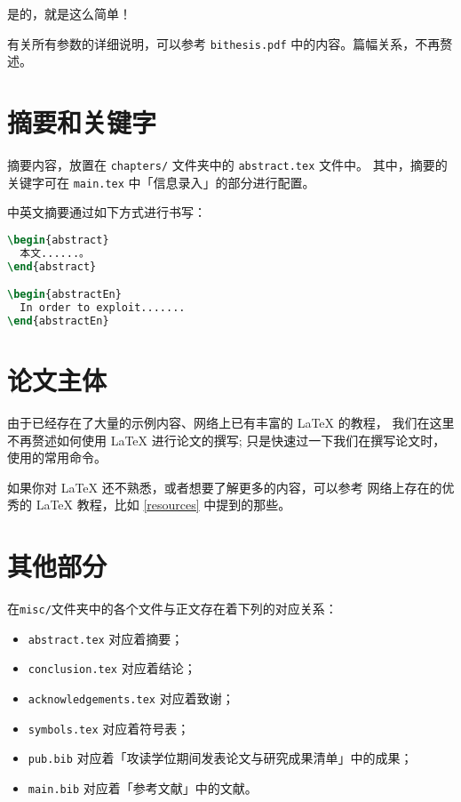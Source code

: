 是的，就是这么简单！

有关所有参数的详细说明，可以参考 \texttt{bithesis.pdf} 中的内容。篇幅关系，不再赘述。

\section{摘要和关键字}

摘要内容，放置在 \texttt{chapters/} 文件夹中的 \texttt{abstract.tex} 文件中。
其中，摘要的关键字可在 \texttt{main.tex} 中「信息录入」的部分进行配置。

中英文摘要通过如下方式进行书写：

\begin{lstlisting}[language=TeX]
\begin{abstract}
  本文......。
\end{abstract}

\begin{abstractEn}
  In order to exploit.......
\end{abstractEn}
\end{lstlisting}


\section{论文主体}

由于已经存在了大量的示例内容、网络上已有丰富的 \LaTeX{} 的教程，
我们在这里不再赘述如何使用 \LaTeX{} 进行论文的撰写;
只是快速过一下我们在撰写论文时，使用的常用命令。

如果你对 \LaTeX{} 还不熟悉，或者想要了解更多的内容，可以参考
网络上存在的优秀的 \LaTeX{} 教程，比如 \ref{resources} 中提到的那些。

\section{其他部分}

在\texttt{misc/}文件夹中的各个文件与正文存在着下列的对应关系：
\begin{itemize}
  \item \texttt{abstract.tex} 对应着摘要；
  \item \texttt{conclusion.tex} 对应着结论；
  \item \texttt{acknowledgements.tex} 对应着致谢；
  \item \texttt{symbols.tex} 对应着符号表；
  \item \texttt{pub.bib} 对应着「攻读学位期间发表论文与研究成果清单」中的成果；
  \item \texttt{main.bib} 对应着「参考文献」中的文献。
\end{itemize}

